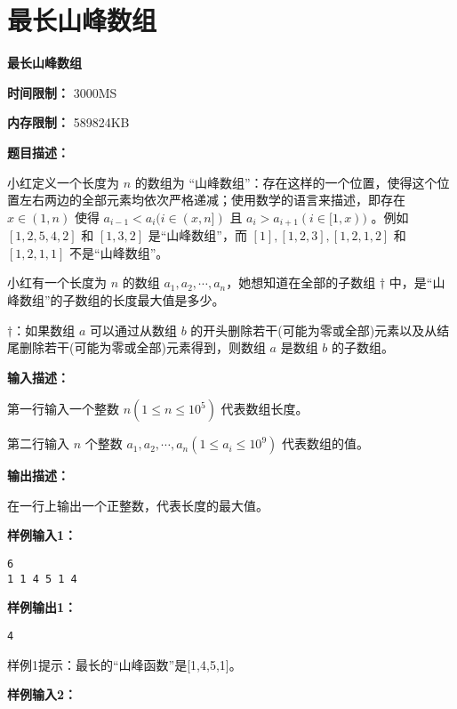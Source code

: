 \documentclass[a4paper]{ctexart}
\begin{document}
	
\section{最长山峰数组}
	
\begin{center}
	\Large \textbf{最长山峰数组}
\end{center}
	
\noindent\textbf{时间限制：} 3000MS
	
\noindent\textbf{内存限制：} 589824KB
	
\vspace{10pt}
	
\noindent\textbf{题目描述：}
	
小红定义一个长度为 $n$ 的数组为 “山峰数组”：存在这样的一个位置，使得这个位置左右两边的全部元素均依次严格递减；使用数学的语言来描述，即存在 $x \in (1,n)$ 使得 $a_{i-1}< a_i (i \in (x, n])$ 且 $a_i > a_{i+1} (i \in [1, x))$ 。例如 $[1,2,5,4,2]$ 和 $[1,3,2]$ 是“山峰数组”，而 $[1],[1,2,3],[1,2,1,2]$ 和 $[1,2,1,1]$ 不是“山峰数组”。
	
小红有一个长度为 $n$ 的数组 $a_1, a_2, \cdots, a_n$，她想知道在全部的子数组 $\dagger$ 中，是“山峰数组”的子数组的长度最大值是多少。
	
$\dagger$：如果数组 $a$ 可以通过从数组 $b$ 的开头删除若干(可能为零或全部)元素以及从结尾删除若干(可能为零或全部)元素得到，则数组 $a$ 是数组 $b$ 的子数组。
	
\noindent\textbf{输入描述：}
	
第一行输入一个整数 $n (1 \leq n \leq 10^5)$ 代表数组长度。

第二行输入 $n$ 个整数 $a_1,a_2,\cdots,a_n (1 \leq a_i \leq 10^9)$ 代表数组的值。
	
\noindent\textbf{输出描述：} 
	
在一行上输出一个正整数，代表长度的最大值。
	
\noindent\textbf{样例输入1：}
	
\lstset{numbers=none}
\begin{lstlisting}
6
1 1 4 5 1 4
\end{lstlisting}
\lstset{numbers=left}
	
\noindent\textbf{样例输出1：}
\lstset{numbers=none}
\begin{lstlisting}
4
\end{lstlisting}
\lstset{numbers=left}
	
\noindent 样例1提示：最长的“山峰函数”是[1,4,5,1]。
	
\noindent\textbf{样例输入2：}
	
\end{document}
